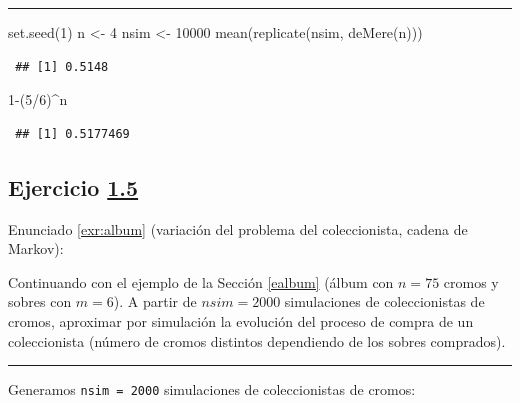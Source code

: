 \documentclass[
]{book}
\newenvironment{Shaded}{\begin{snugshade}}{\end{snugshade}}
\newcommand{\DecValTok}[1]{\textcolor[rgb]{0.00,0.00,0.81}{#1}}
\newcommand{\FunctionTok}[1]{\textcolor[rgb]{0.00,0.00,0.00}{#1}}
\newcommand{\NormalTok}[1]{#1}
\newcommand{\OtherTok}[1]{\textcolor[rgb]{0.56,0.35,0.01}{#1}}
\newcommand{\SpecialCharTok}[1]{\textcolor[rgb]{0.00,0.00,0.00}{#1}}
\theoremstyle{break}
\theoremstyle{nonumberplain}
\begin{document}
\begin{center}\rule{0.5\linewidth}{0.5pt}\end{center}

\begin{Shaded}
\begin{Highlighting}[]
\FunctionTok{set.seed}\NormalTok{(}\DecValTok{1}\NormalTok{)}
\NormalTok{n }\OtherTok{\textless{}{-}} \DecValTok{4}
\NormalTok{nsim }\OtherTok{\textless{}{-}} \DecValTok{10000}
\FunctionTok{mean}\NormalTok{(}\FunctionTok{replicate}\NormalTok{(nsim, }\FunctionTok{deMere}\NormalTok{(n)))}
\end{Highlighting}
\end{Shaded}

\begin{verbatim}
 ## [1] 0.5148
\end{verbatim}

\begin{Shaded}
\begin{Highlighting}[]
\DecValTok{1}\SpecialCharTok{{-}}\NormalTok{(}\DecValTok{5}\SpecialCharTok{/}\DecValTok{6}\NormalTok{)}\SpecialCharTok{\^{}}\NormalTok{n}
\end{Highlighting}
\end{Shaded}

\begin{verbatim}
 ## [1] 0.5177469
\end{verbatim}

\hypertarget{sol-album}{%
\subsection{\texorpdfstring{Ejercicio \href{ejercicios.html\#exr:album}{1.5}}{Ejercicio 1.5}}\label{sol-album}}

Enunciado \ref{exr:album} (variación del problema del coleccionista, cadena de Markov):

Continuando con el ejemplo de la Sección \ref{ealbum}
(álbum con \(n = 75\) cromos y sobres con \(m = 6\)). A partir de \(nsim=2000\) simulaciones de coleccionistas de cromos, aproximar por simulación la evolución del proceso de compra de un coleccionista (número de cromos distintos dependiendo de los sobres comprados).

\begin{center}\rule{0.5\linewidth}{0.5pt}\end{center}

Generamos \texttt{nsim\ =\ 2000} simulaciones de coleccionistas de cromos:
\end{document}
